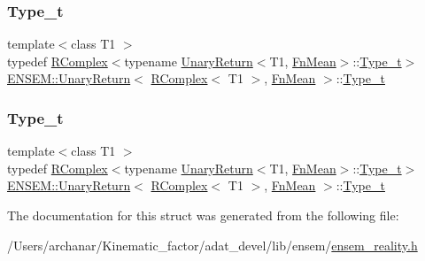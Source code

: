 \subsubsection{\texorpdfstring{Type\_t}{Type\_t}\hspace{0.1cm}{\footnotesize\ttfamily [1/2]}}
{\footnotesize\ttfamily template$<$class T1 $>$ \\
typedef \mbox{\hyperlink{classENSEM_1_1RComplex}{R\+Complex}}$<$typename \mbox{\hyperlink{structENSEM_1_1UnaryReturn}{Unary\+Return}}$<$T1, \mbox{\hyperlink{structENSEM_1_1FnMean}{Fn\+Mean}}$>$\+::\mbox{\hyperlink{structENSEM_1_1UnaryReturn_3_01RComplex_3_01T1_01_4_00_01FnMean_01_4_a36f90d415b22308c1707a2639a538763}{Type\+\_\+t}}$>$ \mbox{\hyperlink{structENSEM_1_1UnaryReturn}{E\+N\+S\+E\+M\+::\+Unary\+Return}}$<$ \mbox{\hyperlink{classENSEM_1_1RComplex}{R\+Complex}}$<$ T1 $>$, \mbox{\hyperlink{structENSEM_1_1FnMean}{Fn\+Mean}} $>$\+::\mbox{\hyperlink{structENSEM_1_1UnaryReturn_3_01RComplex_3_01T1_01_4_00_01FnMean_01_4_a36f90d415b22308c1707a2639a538763}{Type\+\_\+t}}}

\mbox{\label{structENSEM_1_1UnaryReturn_3_01RComplex_3_01T1_01_4_00_01FnMean_01_4_a36f90d415b22308c1707a2639a538763}} 
\subsubsection{\texorpdfstring{Type\_t}{Type\_t}\hspace{0.1cm}{\footnotesize\ttfamily [2/2]}}
{\footnotesize\ttfamily template$<$class T1 $>$ \\
typedef \mbox{\hyperlink{classENSEM_1_1RComplex}{R\+Complex}}$<$typename \mbox{\hyperlink{structENSEM_1_1UnaryReturn}{Unary\+Return}}$<$T1, \mbox{\hyperlink{structENSEM_1_1FnMean}{Fn\+Mean}}$>$\+::\mbox{\hyperlink{structENSEM_1_1UnaryReturn_3_01RComplex_3_01T1_01_4_00_01FnMean_01_4_a36f90d415b22308c1707a2639a538763}{Type\+\_\+t}}$>$ \mbox{\hyperlink{structENSEM_1_1UnaryReturn}{E\+N\+S\+E\+M\+::\+Unary\+Return}}$<$ \mbox{\hyperlink{classENSEM_1_1RComplex}{R\+Complex}}$<$ T1 $>$, \mbox{\hyperlink{structENSEM_1_1FnMean}{Fn\+Mean}} $>$\+::\mbox{\hyperlink{structENSEM_1_1UnaryReturn_3_01RComplex_3_01T1_01_4_00_01FnMean_01_4_a36f90d415b22308c1707a2639a538763}{Type\+\_\+t}}}



The documentation for this struct was generated from the following file\+:\begin{DoxyCompactItemize}
\item 
/\+Users/archanar/\+Kinematic\+\_\+factor/adat\+\_\+devel/lib/ensem/\mbox{\hyperlink{lib_2ensem_2ensem__reality_8h}{ensem\+\_\+reality.\+h}}\end{DoxyCompactItemize}
